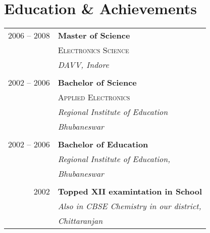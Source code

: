 \documentclass[10pt]{article} %
\begin{document}
{\begin{minipage}[t]{0.44\textwidth}

\section{Education \& Achievements} 

\begin{tabular}{rl} %


2006 -- 2008 & \textbf{Master of Science} \\ 
& \textsc{Electronics Science} \\ 
& \textit{DAVV, Indore}\\
&\\
	 

2002 -- 2006 & \textbf{Bachelor of Science } \\
& \textsc{Applied Electronics} \\
& \textit{Regional Institute of Education} \\
& \textit{Bhubaneswar}\\	
&\\

	 

2002 -- 2006 & \textbf{Bachelor of Education} \\
& \textit{Regional Institute of Education,} \\
& \textit{Bhubaneswar}\\\\



2002 & \textbf{Topped XII examintation in School} \\
& \textit{Also in CBSE Chemistry in our district,} \\
& \textit{Chittaranjan}\\	



\end{tabular}
\end{minipage}}
\end{document}
